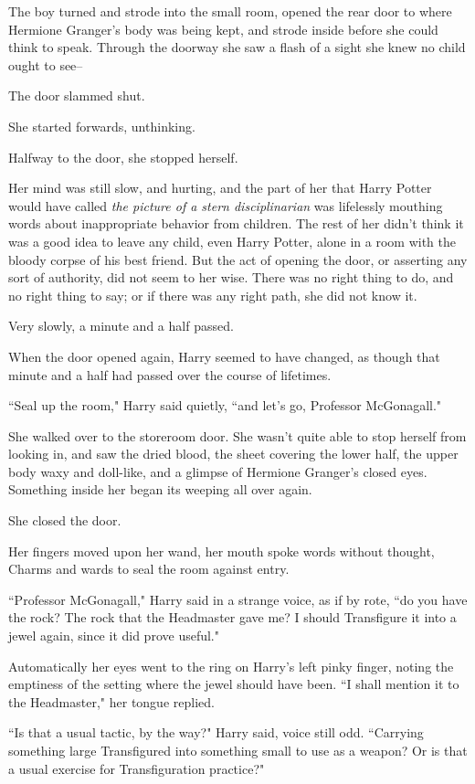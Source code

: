 The boy turned and strode into the small room, opened the rear door to where Hermione Granger's body was being kept, and strode inside before she could think to speak. Through the doorway she saw a flash of a sight she knew no child ought to see\---

The door slammed shut.

She started forwards, unthinking.

Halfway to the door, she stopped herself.

Her mind was still slow, and hurting, and the part of her that Harry Potter would have called \emph{the picture of a stern disciplinarian} was lifelessly mouthing words about inappropriate behavior from children. The rest of her didn't think it was a good idea to leave any child, even Harry Potter, alone in a room with the bloody corpse of his best friend. But the act of opening the door, or asserting any sort of authority, did not seem to her wise. There was no right thing to do, and no right thing to say; or if there was any right path, she did not know it.

Very slowly, a minute and a half passed.

\later

When the door opened again, Harry seemed to have changed, as though that minute and a half had passed over the course of lifetimes.

``Seal up the room," Harry said quietly, ``and let's go, Professor McGonagall."

She walked over to the storeroom door. She wasn't quite able to stop herself from looking in, and saw the dried blood, the sheet covering the lower half, the upper body waxy and doll-like, and a glimpse of Hermione Granger's closed eyes. Something inside her began its weeping all over again.

She closed the door.

Her fingers moved upon her wand, her mouth spoke words without thought, Charms and wards to seal the room against entry.

``Professor McGonagall," Harry said in a strange voice, as if by rote, ``do you have the rock? The rock that the Headmaster gave me? I should Transfigure it into a jewel again, since it did prove useful."

Automatically her eyes went to the ring on Harry's left pinky finger, noting the emptiness of the setting where the jewel should have been. ``I shall mention it to the Headmaster," her tongue replied.

``Is that a usual tactic, by the way?" Harry said, voice still odd. ``Carrying something large Transfigured into something small to use as a weapon? Or is that a usual exercise for Transfiguration practice?"

